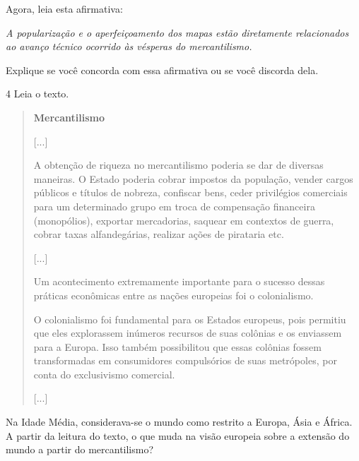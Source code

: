 Agora, leia esta afirmativa:

\textit{A popularização e o aperfeiçoamento dos mapas estão diretamente relacionados
ao avanço técnico ocorrido às vésperas do mercantilismo.}

Explique se você concorda com essa afirmativa ou se você discorda dela.



\num{4} Leia o texto.

\begin{quote}
\textbf{Mercantilismo}

{[}...{]}

A obtenção de riqueza no mercantilismo poderia se dar de diversas
maneiras. O Estado poderia cobrar impostos da população, vender cargos
públicos e títulos de nobreza, confiscar bens, ceder privilégios
comerciais para um determinado grupo em troca de compensação financeira
(monopólios), exportar mercadorias, saquear em contextos de guerra,
cobrar taxas alfandegárias, realizar ações de pirataria
etc.

{[}...{]}

Um acontecimento extremamente importante para o sucesso
dessas práticas econômicas entre as nações europeias foi o
colonialismo.

O colonialismo foi fundamental para os Estados europeus, pois
permitiu que eles explorassem inúmeros recursos de suas colônias e os
enviassem para a Europa. Isso também possibilitou que essas colônias
fossem transformadas em consumidores compulsórios de suas metrópoles,
por conta do exclusivismo comercial.

{[}...{]}

\end{quote}

Na Idade Média, considerava-se o mundo como
restrito a Europa, Ásia e África. A partir da leitura do texto, o que
muda na visão europeia sobre a extensão do mundo a partir do
mercantilismo?



